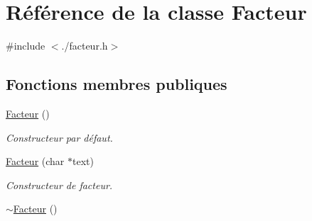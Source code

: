 \hypertarget{classFacteur}{
\section{Référence de la classe Facteur}
\label{classFacteur}
}


{\ttfamily \#include $<$./facteur.h$>$}

\subsection*{Fonctions membres publiques}
\begin{DoxyCompactItemize}
\item 
\hypertarget{classFacteur_a989e3e6f53f97d5adfd2e7e3fc1f4cf1}{
\hyperlink{classFacteur_a989e3e6f53f97d5adfd2e7e3fc1f4cf1}{Facteur} ()}
\label{classFacteur_a989e3e6f53f97d5adfd2e7e3fc1f4cf1}

\begin{DoxyCompactList}\small\item\em Constructeur par défaut. \item\end{DoxyCompactList}\item 
\hyperlink{classFacteur_af0d4423b4ebe026d9dbe8ef06eb23d9f}{Facteur} (char $\ast$text)
\begin{DoxyCompactList}\small\item\em Constructeur de facteur. \item\end{DoxyCompactList}\item 
\hypertarget{classFacteur_a71486fcb174b3a49520bf1e60fbf8e69}{
\hyperlink{classFacteur_a71486fcb174b3a49520bf1e60fbf8e69}{$\sim$Facteur} ()}
\label{classFacteur_a71486fcb174b3a49520bf1e60fbf8e69}


\end{DoxyCompactItemize}
